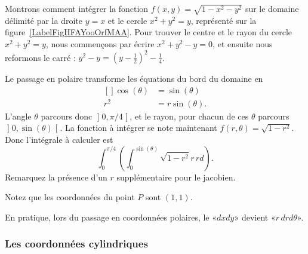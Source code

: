 \begin{example}     \label{ExpmfDtAtV}
    Montrons comment intégrer la fonction $f(x,y)=\sqrt{1-x^2-y^2}$ sur le domaine délimité par la droite $y=x$ et le cercle $x^2+y^2=y$, représenté sur la figure~\ref{LabelFigHFAYooOrfMAA}. Pour trouver le centre et le rayon du cercle $x^2+y^2=y$, nous commençons par écrire $x^2+y^2-y=0$, et ensuite nous reformons le carré : $y^2-y=(y-\frac{ 1 }{2})^2-\frac{1}{ 4 }$.

\newcommand{\CaptionFigHFAYooOrfMAA}{Passage en polaire pour intégrer sur un morceau de cercle.}


    Le passage en polaire transforme les équations du bord du domaine en
    \begin{equation}
        \begin{aligned}[]
            \cos(\theta)&=\sin(\theta)\\
            r^2&=r\sin(\theta).
        \end{aligned}
    \end{equation}
    L'angle $\theta$ parcours donc $\mathopen] 0 , \pi/4 \mathclose[$, et le rayon, pour chacun de ces $\theta$ parcours $\mathopen] 0 , \sin(\theta) \mathclose[$. La fonction à intégrer se note maintenant $f(r,\theta)=\sqrt{1-r^2}$. Donc l'intégrale à calculer est
    \begin{equation}		\label{PgOMRapIntMultFubiniBoutCercle}
        \int_{0}^{\pi/4}\left( \int_0^{\sin(\theta)}\sqrt{1-r^2}r\,rd \right).
    \end{equation}
    Remarquez la présence d'un $r$ supplémentaire pour le jacobien.

    Notez que les coordonnées du point $P$ sont $(1,1)$.
\end{example}

En pratique, lors du passage en coordonnées polaires, le «$dxdy$» devient «$r\,drd\theta$».

\subsubsection{Les coordonnées cylindriques}

